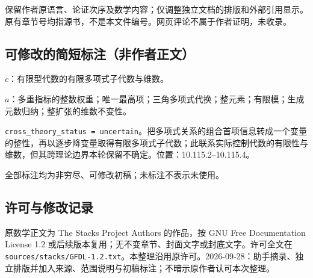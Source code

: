 \documentclass[UTF8,11pt]{ctexart}
\theoremstyle{definition}
\begin{document}
保留作者原语言、论证次序及数学内容；仅调整独立文档的排版和外部引用显示。原有章节号均指源书，不是本文件编号。网页评论不属于作者证明，未收录。
\subsection*{可修改的简短标注（非作者正文）}
$c$：有限型代数的有限多项式子代数与维数。

$a$：多重指标的整数权重；唯一最高项；三角多项式代换；整元素；有限模；生成元数归纳；整扩张的维数不变性。

\texttt{cross\_theory\_status = uncertain}。把多项式关系的组合首项信息转成一个变量的整性，再以逐步降变量取得有限多项式子代数；此联系实际控制代数的有限性与维数，但其跨理论边界本轮保留不确定。位置：10.115.2--10.115.4。

全部标注均为非穷尽、可修改初稿；未标注不表示未使用。
\subsection*{许可与修改记录}
原数学正文为 The Stacks Project Authors 的作品，按 GNU Free Documentation License 1.2 或后续版本复用；无不变章节、封面文字或封底文字。许可全文在 \texttt{sources/stacks/GFDL-1.2.txt}。本整理沿用原许可。2026-09-28：助手摘录、独立排版并加入来源、范围说明与初稿标注；不暗示原作者认可本次整理。
\end{document}
